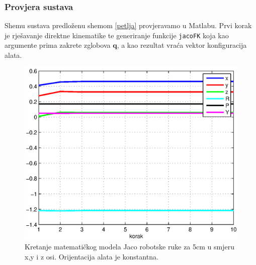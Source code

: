 \documentclass[times, utf8, diplomski, numeric]{fer}
\begin{document}
\subsubsection{Provjera sustava}
Shemu sustava predloženu shemom \ref{petlja} provjeravamo u Matlabu.
Prvi korak je rješavanje direktne kinematike te generiranje funkcije \verb|jacoFK| koja kao argumente prima zakrete zglobova $\mathbf{q}$,
a kao rezultat vraća vektor konfiguracija alata.
\begin{figure}[h!]
\centering
\includegraphics[scale=0.7]{P1}
\caption{Kretanje matematičkog modela Jaco robotske ruke za 5cm u smjeru x,y i z osi. Orijentacija alata je konstantna.} \label{P1}
\end{figure}
\end{document}
